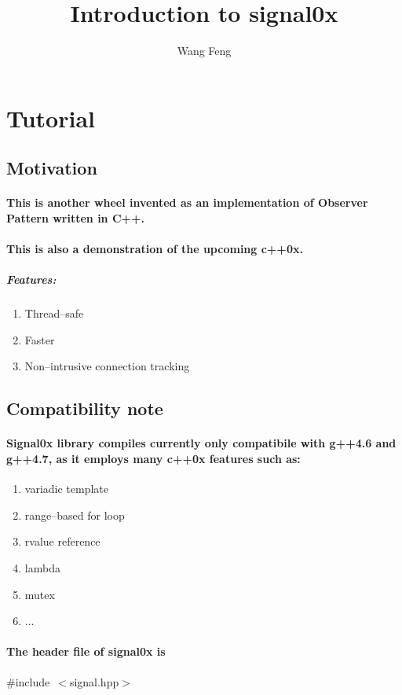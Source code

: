 \documentclass[9pt,onside,a4paper]{article}
\author{Wang Feng}
\title{Introduction to signal0x}
\newcommand{\hlstd}[1]{\textcolor[rgb]{0.2,0,0.4}{#1}}
\newcommand{\hlppc}[1]{\textcolor[rgb]{0.33,0.45,0.69}{#1}}
\begin{document}
\maketitle

\section{Tutorial}
\subsection{Motivation}

\paragraph{This is another wheel invented as an implementation of Observer Pattern written in C++.}
\paragraph{This is also a demonstration of the upcoming c++0x.}
\subparagraph{Features:}
\begin{enumerate}
    \item Thread--safe
    \item Faster
    \item Non--intrusive connection tracking 
\end{enumerate}

\subsection{Compatibility note}

\paragraph{Signal0x library compiles currently only compatibile with g++4.6 and g++4.7, as it employs many c++0x features such as:}
\begin{enumerate}
\item variadic template
\item range--based for loop
\item rvalue reference
\item lambda
\item mutex
\item ...
\end{enumerate}


\paragraph{The header file of signal0x is\\}
\hlstd{}\hlppc{\#include\ $<$signal.hpp$>$}\hspace*{\fill}
\end{document}
